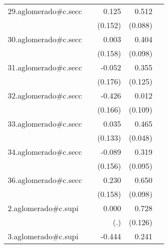 {\begin{longtable}{l*{4}{D{.}{.}{-1}}}
\addlinespace
29.aglomerado#c.secc&                     &       0.125         &       0.512\sym{***}&                     \\
            &                     &     (0.152)         &     (0.088)         &                     \\
\addlinespace
30.aglomerado#c.secc&                     &       0.003         &       0.404\sym{***}&                     \\
            &                     &     (0.158)         &     (0.098)         &                     \\
\addlinespace
31.aglomerado#c.secc&                     &      -0.052         &       0.355\sym{**} &                     \\
            &                     &     (0.176)         &     (0.125)         &                     \\
\addlinespace
32.aglomerado#c.secc&                     &      -0.426\sym{*}  &       0.012         &                     \\
            &                     &     (0.166)         &     (0.109)         &                     \\
\addlinespace
33.aglomerado#c.secc&                     &       0.035         &       0.465\sym{***}&                     \\
            &                     &     (0.133)         &     (0.048)         &                     \\
\addlinespace
34.aglomerado#c.secc&                     &      -0.089         &       0.319\sym{***}&                     \\
            &                     &     (0.156)         &     (0.095)         &                     \\
\addlinespace
36.aglomerado#c.secc&                     &       0.230         &       0.650\sym{***}&                     \\
            &                     &     (0.158)         &     (0.098)         &                     \\
\addlinespace
2.aglomerado#c.supi&                     &       0.000         &       0.728\sym{***}&                     \\
            &                     &         (.)         &     (0.126)         &                     \\
\addlinespace
3.aglomerado#c.supi&                     &      -0.444         &       0.241         &                     \\

\end{longtable}}

